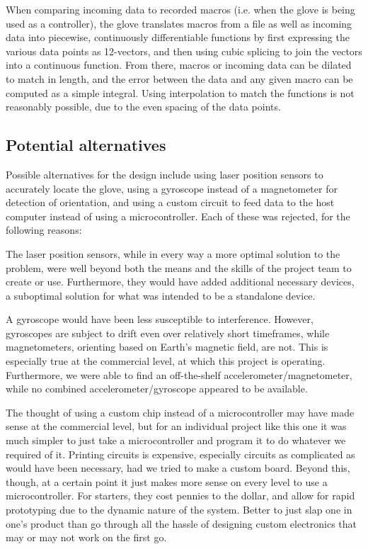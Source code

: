 \documentclass{article}
\begin{document}
	When comparing incoming data to recorded macros (i.e. when the glove is being used as a controller), the glove translates macros from a file as well as incoming data into piecewise, continuously differentiable functions by first expressing the various data points as 12-vectors, and then using cubic splicing to join the vectors into a continuous function. From there, macros or incoming data can be dilated to match in length, and the error between the data and any given macro can be computed as a simple integral. Using interpolation to match the functions is not reasonably possible, due to the even spacing of the data points.
	
	\subsection*{Potential alternatives}
	
	Possible alternatives for the design include using laser position sensors to accurately locate the glove, using a gyroscope instead of a magnetometer for detection of orientation, and using a custom circuit to feed data to the host computer instead of using a microcontroller. Each of these was rejected, for the following reasons:
	
	The laser position sensors, while in every way a more optimal solution to the problem, were well beyond both the means and the skills of the project team to create or use. Furthermore, they would have added additional necessary devices, a suboptimal solution for what was intended to be a standalone device.
	
	A gyroscope would have been less susceptible to interference. However, gyroscopes are subject to drift even over relatively short timeframes, while magnetometers, orienting based on Earth's magnetic field, are not. This is especially true at the commercial level, at which this project is operating. Furthermore, we were able to find an off-the-shelf accelerometer/magnetometer, while no combined accelerometer/gyroscope appeared to be available.
	
	The thought of using a custom chip instead of a microcontroller may have made sense at the commercial level, but for an individual project like this one it was much simpler to just take a microcontroller and program it to do whatever we required of it. Printing circuits is expensive, especially circuits as complicated as would have been necessary, had we tried to make a custom board. Beyond this, though, at a certain point it just makes more sense on every level to use a microcontroller. For starters, they cost pennies to the dollar, and allow for rapid prototyping due to the dynamic nature of the system. Better to just slap one in one's product than go through all the hassle of designing custom electronics that may or may not work on the first go.
	
\end{document}
